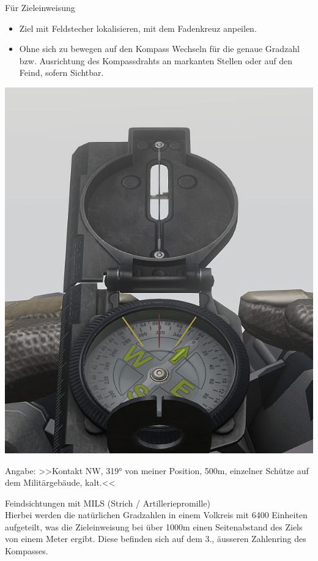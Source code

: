 	Für Zieleinweisung
		\begin{itemize}
 			\item Ziel mit Feldstecher lokalisieren, mit dem Fadenkreuz anpeilen.
			\item Ohne sich zu bewegen auf den Kompass Wechseln für die genaue Gradzahl bzw. Ausrichtung des Kompassdrahts an markanten Stellen oder auf den Feind, sofern Sichtbar.
		\end{itemize}

\begin{minipage}[t]{1\textwidth}
	\includegraphics[width=\textwidth]{./img/fortgeschrittenes/karteUndMarkierungen/Kompass4.jpg}
\end{minipage}
	Angabe: >>Kontakt NW, 319° von meiner Position, 500m, einzelner Schütze auf dem Militärgebäude, kalt.<<

	Feindsichtungen mit MILS (Strich / Artilleriepromille) \\

	Hierbei werden die natürlichen Gradzahlen in einem Volkreis mit 6400 Einheiten aufgeteilt, was die Zieleinweisung bei über 1000m einen Seitenabstand des Ziels von einem Meter ergibt. Diese befinden sich auf dem 3., äusseren Zahlenring des Kompasses.  \\


